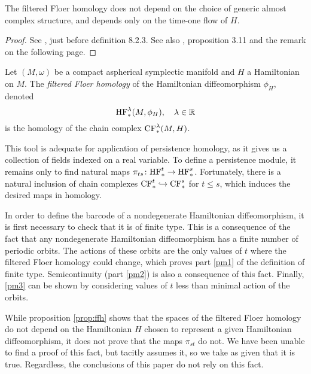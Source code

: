 \begin{prop}\label{prop:ffh}
The filtered Floer homology does not depend on the choice of generic almost complex structure, and depends only on the time-one flow of $H$.
\end{prop}

\begin{proof}
See \cite{polterovich}, just before definition 8.2.3. See also \cite{schwarz}, proposition 3.11 and the remark on the following page.
\end{proof}

\begin{definition}
Let $(M,\omega)$ be a compact aspherical symplectic manifold and $H$ a Hamiltonian on $M$. The \emph{filtered Floer homology} of the Hamiltonian diffeomorphism $\phi_H$, denoted
\begin{equation}
\mathrm{HF}^\lambda_*(M,\phi_H), \quad \lambda \in \mathbb{R}
\end{equation}
is the homology of the chain complex $\mathrm{CF}^\lambda_*(M,H)$.
\end{definition}

This tool is adequate for application of persistence homology, as it gives us a collection of fields indexed on a real variable. To define a persistence module, it remains only to find natural maps $\pi_{ts} \colon \mathrm{HF}^t_* \to \mathrm{HF}^s_*$. Fortunately, there is a natural inclusion of chain complexes $\mathrm{CF}^t_* \hookrightarrow \mathrm{CF}^s_*$ for $t \leq s$, which induces the desired maps in homology.

\begin{remark}
In order to define the barcode of a nondegenerate Hamiltonian diffeomorphism, it is first necessary to check that it is of finite type. This is a consequence of the fact that any nondegenerate Hamiltonian diffeomorphism has a finite number of periodic orbits. The actions of these orbits are the only values of $t$ where the filtered Floer homology could change, which proves part \ref{pm1} of the definition of finite type. Semicontinuity (part \ref{pm2}) is also a consequence of this fact. Finally, \ref{pm3} can be shown by considering values of $t$ less than minimal action of the orbits.
\end{remark}

\begin{remark}
While proposition \ref{prop:ffh} shows that the spaces of the filtered Floer homology do not depend on the Hamiltonian $H$ chosen to represent a given Hamiltonian diffeomorphism, it does not prove that the maps $\pi_{st}$ do not. We have been unable to find a proof of this fact, but \cite{polterovich} tacitly assumes it, so we take as given that it is true. Regardless, the conclusions of this paper do not rely on this fact.
\end{remark}

